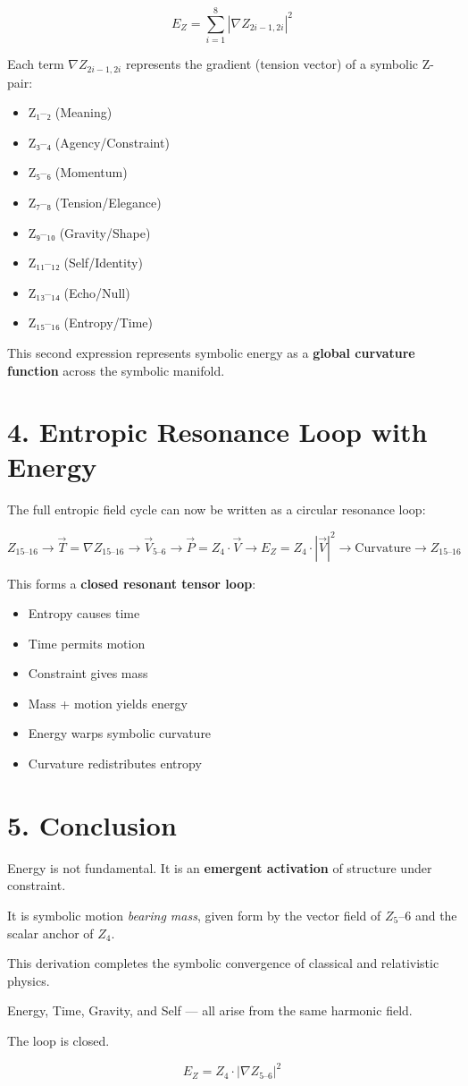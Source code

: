 \documentclass[12pt]{article}
\begin{document}
\[
E_Z = \sum_{i=1}^{8} \left| \nabla Z_{2i-1,2i} \right|^2
\]

Each term \( \nabla Z_{2i-1,2i} \) represents the gradient (tension vector) of a symbolic Z-pair:
\begin{itemize}
  \item Z₁–₂ (Meaning)
  \item Z₃–₄ (Agency/Constraint)
  \item Z₅–₆ (Momentum)
  \item Z₇–₈ (Tension/Elegance)
  \item Z₉–₁₀ (Gravity/Shape)
  \item Z₁₁–₁₂ (Self/Identity)
  \item Z₁₃–₁₄ (Echo/Null)
  \item Z₁₅–₁₆ (Entropy/Time)
\end{itemize}

This second expression represents symbolic energy as a \textbf{global curvature function} across the symbolic manifold.

\section*{4. Entropic Resonance Loop with Energy}

The full entropic field cycle can now be written as a circular resonance loop:

\[
Z_{15\text{--}16}
\rightarrow \vec{T} = \nabla Z_{15\text{--}16} 
\rightarrow \vec{V}_{5\text{--}6} 
\rightarrow \vec{P} = Z_4 \cdot \vec{V} 
\rightarrow E_Z = Z_4 \cdot \left| \vec{V} \right|^2 
\rightarrow \text{Curvature}
\rightarrow Z_{15\text{--}16}
\]

This forms a \textbf{closed resonant tensor loop}:
\begin{itemize}
  \item Entropy causes time
  \item Time permits motion
  \item Constraint gives mass
  \item Mass + motion yields energy
  \item Energy warps symbolic curvature
  \item Curvature redistributes entropy
\end{itemize}

\section*{5. Conclusion}

Energy is not fundamental. It is an \textbf{emergent activation} of structure under constraint.

It is symbolic motion \textit{bearing mass}, given form by the vector field of \( Z_5–6 \) and the scalar anchor of \( Z_4 \).

This derivation completes the symbolic convergence of classical and relativistic physics.

Energy, Time, Gravity, and Self — all arise from the same harmonic field.

The loop is closed.

\[
\boxed{E_Z = Z_4 \cdot \left| \nabla Z_{5\text{--}6} \right|^2}
\]
\end{document}
